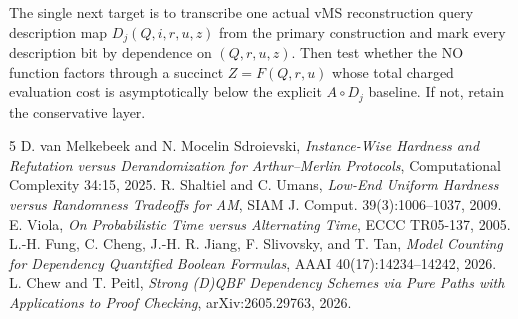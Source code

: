 \documentclass[11pt]{article}
\begin{document}
The single next target is to transcribe one actual vMS reconstruction query description map $D_j(Q,i,r,u,z)$ from the primary construction and mark every description bit by dependence on $(Q,r,u,z)$. Then test whether the NO function factors through a succinct $Z=F(Q,r,u)$ whose total charged evaluation cost is asymptotically below the explicit $A\circ D_j$ baseline. If not, retain the conservative layer.

\begin{thebibliography}{5}
 D. van Melkebeek and N. Mocelin Sdroievski, \emph{Instance-Wise Hardness and Refutation versus Derandomization for Arthur--Merlin Protocols}, Computational Complexity 34:15, 2025.
 R. Shaltiel and C. Umans, \emph{Low-End Uniform Hardness versus Randomness Tradeoffs for AM}, SIAM J. Comput. 39(3):1006--1037, 2009.
 E. Viola, \emph{On Probabilistic Time versus Alternating Time}, ECCC TR05-137, 2005.
 L.-H. Fung, C. Cheng, J.-H. R. Jiang, F. Slivovsky, and T. Tan, \emph{Model Counting for Dependency Quantified Boolean Formulas}, AAAI 40(17):14234--14242, 2026.
 L. Chew and T. Peitl, \emph{Strong (D)QBF Dependency Schemes via Pure Paths with Applications to Proof Checking}, arXiv:2605.29763, 2026.
\end{thebibliography}
\end{document}
